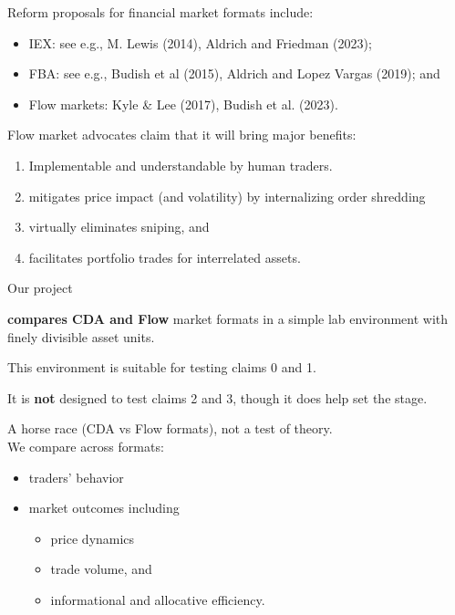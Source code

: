\documentclass[10pt]{beamer}
\begin{document}
\begin{frame}{Reform proposals}
for financial market formats include:
    \begin{itemize}
\item IEX: see e.g., M. Lewis (2014), Aldrich and Friedman (2023); \pause
\item FBA: see e.g., Budish et al (2015), Aldrich and Lopez Vargas (2019); and \pause
\item Flow markets:  Kyle \& Lee (2017), Budish et al. (2023).
\end{itemize}
\end{frame}

\begin{frame}{Flow market advocates claim}
that it will bring major benefits:
\begin{enumerate}
\item[0.] Implementable and understandable by human traders.
\item mitigates price impact 
(and volatility) by internalizing order shredding \pause
\item virtually eliminates sniping, and \pause
\item facilitates portfolio trades for interrelated assets.
\end{enumerate}
\end{frame}



\begin{frame}{Our project}

\textbf{compares CDA and Flow} market formats in a simple lab environment  with finely divisible asset units. 
\pause

This environment is 
suitable for testing claims 0 and 1.
\pause

It is \textbf{not} designed to test claims 2 and 3, though it does help set the stage. \pause 

\bigskip

A horse race (CDA vs Flow formats), not a test of theory.\\ \pause 
We compare across formats:
\begin{itemize}
\item traders' behavior \pause
\item market outcomes including 
\begin{itemize}
    \item price dynamics \pause
\item trade volume, and \pause
\item informational and allocative efficiency. 
\end{itemize} 
\end{itemize}


\end{frame}
\end{document}
